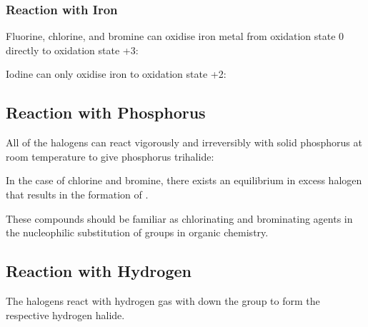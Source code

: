 


			\subsubsection{Reaction with Iron}

				Fluorine, chlorine, and bromine can oxidise iron metal from oxidation state 0 directly to
				oxidation state +3:


				Iodine can only oxidise iron to oxidation state +2:




		\subsection{Reaction with Phosphorus}

			All of the halogens can react vigorously and irreversibly with solid phosphorus at room temperature to give phosphorus trihalide:



			In the case of chlorine and bromine, there exists an equilibrium in excess halogen that results in the formation of .


			These compounds should be familiar as chlorinating and brominating agents in the nucleophilic substitution of  groups in
			organic chemistry.




		\subsection{Reaction with Hydrogen}

			The halogens react with hydrogen gas with  down the group to form the respective hydrogen halide.


